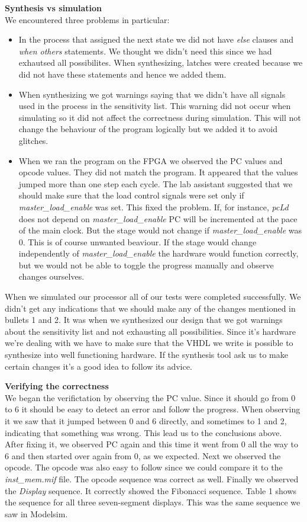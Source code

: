 \documentclass[a4paper,11pt]{article}
\begin{document}
\textbf{Synthesis vs simulation}\\
We encountered three problems in particular:
\begin{itemize}
  \item In the process that assigned the next state we did not have \textit{else} clauses and \textit{when others} statements. We thought we didn't need this since we had exhautsed all possibilites. When synthesizing, latches were created because we did not have these statements and hence we added them.
  \item When synthesizing we got warnings saying that we didn't have all signals used in the process in the sensitivity list. This warning did not occur when simulating so it did not affect the correctness during simulation. This will not change the behaviour of the program logically but we added it to avoid glitches.
  \item When we ran the program on the FPGA we observed the PC values and opcode values. They did not match the program. It appeared that the values jumped more than one step each cycle. The lab assistant suggested that we should make sure that the load control signals were set only if \textit{master\_load\_enable} was set. This fixed the problem. If, for instance, \textit{pcLd} does not depend on \textit{master\_load\_enable} PC will be incremented at the pace of the main clock. But the stage would not change if \textit{master\_load\_enable} was 0. This is of course unwanted beaviour. If the stage would change independently of \textit{master\_load\_enable} the hardware would function correctly, but we would not be able to toggle the progress manually and observe changes ourselves.
\end{itemize}

When we simulated our processor all of our tests were completed successfully. We didn't get any indications that we should make any of the changes mentioned in bullets 1 and 2. It was when we synthesized our design that we got warnings about the sensitivity list and not exhausting all possibilities. Since it's hardware we're dealing with we have to make sure that the VHDL we write is possible to synthesize into well functioning hardware. If the synthesis tool ask us to make certain changes it's a good idea to follow its advice. 

\textbf{Verifying the correctness} \\
We began the verifictation by observing the PC value. Since it should go from 0 to 6 it should be easy to detect an error and follow the progress. When observing it we saw that it jumped between 0 and 6 directly, and sometimes to 1 and 2, indicating that something was wrong. This lead us to the conclusions above. After fixing it, we observed PC again and this time it went from 0 all the way to 6 and then started over again from 0, as we expected. Next we observed the opcode. The opcode was also easy to follow since we could compare it to the \textit{inst\_mem.mif} file. The opcode sequence was correct as well. Finally we observed the \textit{Display} sequence. It correctly showed the Fibonacci sequence. Table 1 shows the sequence for all three seven-segment displays. This was the same sequence we saw in Modelsim.
\end{document}
